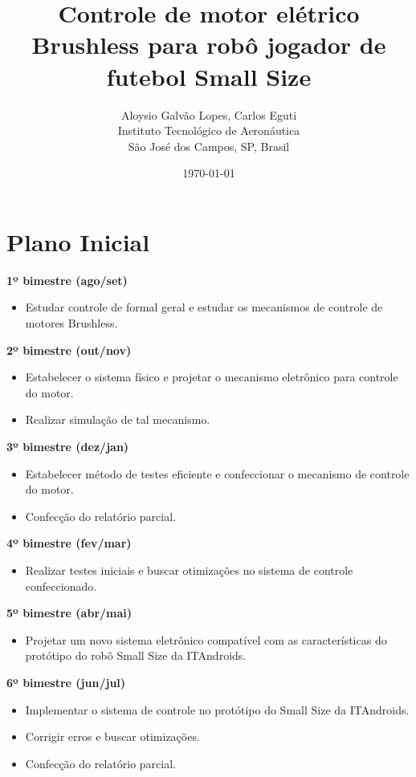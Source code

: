\documentclass[a4paper,11pt]{article}
\title{\textbf{Controle de motor elétrico Brushless para robô jogador de futebol Small Size}}
\author{Aloysio Galvão Lopes, Carlos Eguti\\
	Instituto Tecnológico de Aeronáutica\\
	São José dos Campos, SP, Brasil} %
\date{\today}
\begin{document}
	
	\tableofcontents
	\newpage

	\maketitle
	
	\section{Plano Inicial}
	\textbf{1º bimestre (ago/set)} %
	\begin{itemize}
		\item Estudar controle de formal geral e estudar os mecanismos de controle de motores Brushless.
	\end{itemize}
	\textbf{2º bimestre (out/nov)}
	\begin{itemize}
		\item Estabelecer o sistema físico e projetar o mecanismo eletrônico para controle do motor.
		\item  Realizar simulação de tal mecanismo.
	\end{itemize}
	\textbf{3º bimestre (dez/jan)}
	\begin{itemize}
		\item Estabelecer método de testes eficiente e confeccionar o mecanismo de controle do motor.
		\item Confecção do relatório parcial.
	\end{itemize}
	\textbf{4º bimestre (fev/mar)} %
	\begin{itemize}
		\item Realizar testes iniciais e buscar otimizações no sistema de controle confeccionado.
	\end{itemize}
	\textbf{5º bimestre (abr/mai)}
	\begin{itemize}
		\item Projetar um novo sistema eletrônico compatível com as características do protótipo do robô Small Size da ITAndroids.
	\end{itemize}
	\textbf{6º bimestre (jun/jul)}
	\begin{itemize}
		\item Implementar o sistema de controle no protótipo do Small Size da ITAndroids.
		\item Corrigir erros e buscar otimizações.
		\item Confecção do relatório parcial.
	\end{itemize}
\end{document}
